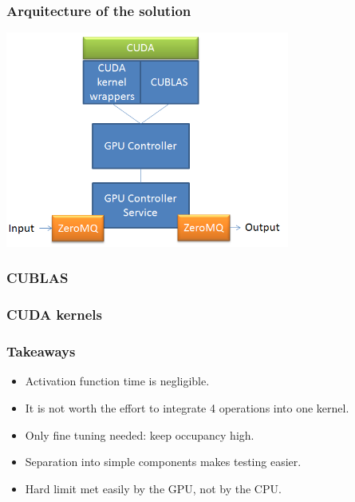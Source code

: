 \begin{frame}
\frametitle{Arquitecture of the solution}
\includegraphics[width=0.7\textwidth]{arq}
\end{frame}


\begin{frame}
      \frametitle{CUBLAS}
      
\end{frame}

\begin{frame}
      \frametitle{CUDA kernels}
      
\end{frame}

\begin{frame}
      \frametitle{Takeaways}
\begin{itemize}
\item Activation function time is negligible.
\item It is not worth the effort to integrate 4 operations into one kernel.
\item Only fine tuning needed: keep occupancy high.
\item Separation into simple components makes testing easier.
\item Hard limit met easily by the GPU, not by the CPU.
\end{itemize}
\end{frame}



